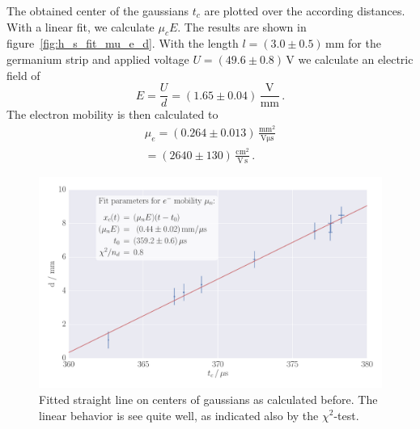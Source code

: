 The obtained center of the gaussians $t_c$ are plotted over the 
according distances. With a linear fit, we calculate $\mu_c E$. 
The results are shown in figure~\ref{fig:h_s_fit_mu_e_d}. 
With the length $l = (3.0 \pm 0.5)\,$mm for the germanium strip and 
applied voltage $U = (49.6 \pm 0.8)\,$V we calculate an electric field of 
\begin{equation}
    E = \frac{U}{d} = (1.65 \pm 0.04)\, \mathrm{\frac{V}{mm}}\, .
\end{equation}
The electron mobility is then calculated to 
\begin{equation}
    \begin{split}
        \mu_e   = (0.264 \pm 0.013)\, \mathrm{\frac{mm^2}{V\mu s}} \\
                = (2640 \pm 130)\, \mathrm{\frac{cm^2}{V\,s}} \,.
    \end{split}
\end{equation}
\begin{figure}
    \includegraphics[width=1.0\textwidth]{figures/haynes_shockley_mu_e_d}
    \caption{
        Fitted straight line on centers of gaussians as calculated before. 
        The linear behavior is see quite well, as indicated also by the 
        $\chi^2$-test.
        }
    \label{fig:h_s_mu_e_d}
\end{figure}

